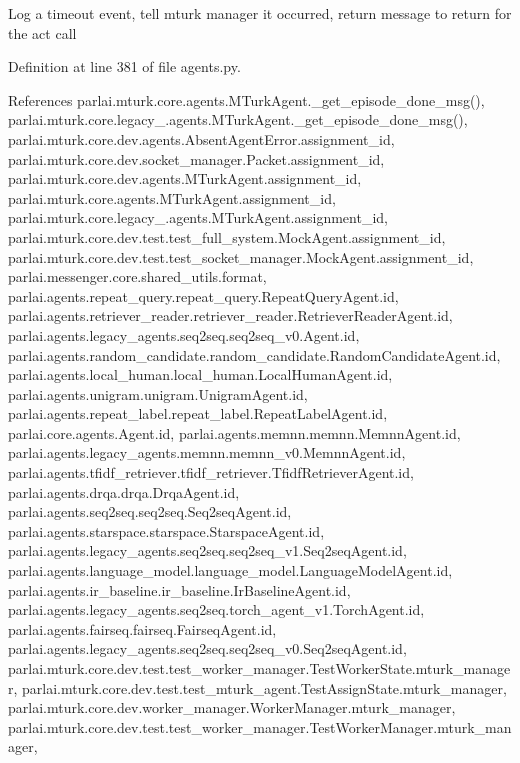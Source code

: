 \begin{DoxyVerb}Log a timeout event, tell mturk manager it occurred, return message
to return for the act call
\end{DoxyVerb}
 

Definition at line 381 of file agents.\+py.



References parlai.\+mturk.\+core.\+agents.\+M\+Turk\+Agent.\+\_\+get\+\_\+episode\+\_\+done\+\_\+msg(), parlai.\+mturk.\+core.\+legacy\+\_.\+agents.\+M\+Turk\+Agent.\+\_\+get\+\_\+episode\+\_\+done\+\_\+msg(), parlai.\+mturk.\+core.\+dev.\+agents.\+Absent\+Agent\+Error.\+assignment\+\_\+id, parlai.\+mturk.\+core.\+dev.\+socket\+\_\+manager.\+Packet.\+assignment\+\_\+id, parlai.\+mturk.\+core.\+dev.\+agents.\+M\+Turk\+Agent.\+assignment\+\_\+id, parlai.\+mturk.\+core.\+agents.\+M\+Turk\+Agent.\+assignment\+\_\+id, parlai.\+mturk.\+core.\+legacy\+\_.\+agents.\+M\+Turk\+Agent.\+assignment\+\_\+id, parlai.\+mturk.\+core.\+dev.\+test.\+test\+\_\+full\+\_\+system.\+Mock\+Agent.\+assignment\+\_\+id, parlai.\+mturk.\+core.\+dev.\+test.\+test\+\_\+socket\+\_\+manager.\+Mock\+Agent.\+assignment\+\_\+id, parlai.\+messenger.\+core.\+shared\+\_\+utils.\+format, parlai.\+agents.\+repeat\+\_\+query.\+repeat\+\_\+query.\+Repeat\+Query\+Agent.\+id, parlai.\+agents.\+retriever\+\_\+reader.\+retriever\+\_\+reader.\+Retriever\+Reader\+Agent.\+id, parlai.\+agents.\+legacy\+\_\+agents.\+seq2seq.\+seq2seq\+\_\+v0.\+Agent.\+id, parlai.\+agents.\+random\+\_\+candidate.\+random\+\_\+candidate.\+Random\+Candidate\+Agent.\+id, parlai.\+agents.\+local\+\_\+human.\+local\+\_\+human.\+Local\+Human\+Agent.\+id, parlai.\+agents.\+unigram.\+unigram.\+Unigram\+Agent.\+id, parlai.\+agents.\+repeat\+\_\+label.\+repeat\+\_\+label.\+Repeat\+Label\+Agent.\+id, parlai.\+core.\+agents.\+Agent.\+id, parlai.\+agents.\+memnn.\+memnn.\+Memnn\+Agent.\+id, parlai.\+agents.\+legacy\+\_\+agents.\+memnn.\+memnn\+\_\+v0.\+Memnn\+Agent.\+id, parlai.\+agents.\+tfidf\+\_\+retriever.\+tfidf\+\_\+retriever.\+Tfidf\+Retriever\+Agent.\+id, parlai.\+agents.\+drqa.\+drqa.\+Drqa\+Agent.\+id, parlai.\+agents.\+seq2seq.\+seq2seq.\+Seq2seq\+Agent.\+id, parlai.\+agents.\+starspace.\+starspace.\+Starspace\+Agent.\+id, parlai.\+agents.\+legacy\+\_\+agents.\+seq2seq.\+seq2seq\+\_\+v1.\+Seq2seq\+Agent.\+id, parlai.\+agents.\+language\+\_\+model.\+language\+\_\+model.\+Language\+Model\+Agent.\+id, parlai.\+agents.\+ir\+\_\+baseline.\+ir\+\_\+baseline.\+Ir\+Baseline\+Agent.\+id, parlai.\+agents.\+legacy\+\_\+agents.\+seq2seq.\+torch\+\_\+agent\+\_\+v1.\+Torch\+Agent.\+id, parlai.\+agents.\+fairseq.\+fairseq.\+Fairseq\+Agent.\+id, parlai.\+agents.\+legacy\+\_\+agents.\+seq2seq.\+seq2seq\+\_\+v0.\+Seq2seq\+Agent.\+id, parlai.\+mturk.\+core.\+dev.\+test.\+test\+\_\+worker\+\_\+manager.\+Test\+Worker\+State.\+mturk\+\_\+manager, parlai.\+mturk.\+core.\+dev.\+test.\+test\+\_\+mturk\+\_\+agent.\+Test\+Assign\+State.\+mturk\+\_\+manager, parlai.\+mturk.\+core.\+dev.\+worker\+\_\+manager.\+Worker\+Manager.\+mturk\+\_\+manager, parlai.\+mturk.\+core.\+dev.\+test.\+test\+\_\+worker\+\_\+manager.\+Test\+Worker\+Manager.\+mturk\+\_\+manager, 
